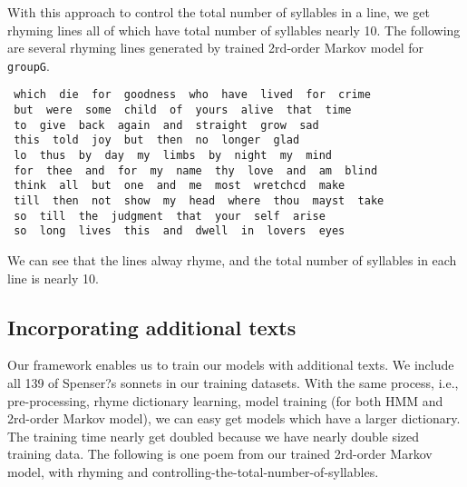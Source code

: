 With this approach to control the total number of syllables in a line, we get rhyming lines all of which have total number of syllables nearly 10. The following are several rhyming lines generated by trained 2rd-order Markov model for \texttt{groupG}.
\begin{lstlisting}
 which  die  for  goodness  who  have  lived  for  crime 
 but  were  some  child  of  yours  alive  that  time 
 to  give  back  again  and  straight  grow  sad 
 this  told  joy  but  then  no  longer  glad 
 lo  thus  by  day  my  limbs  by  night  my  mind 
 for  thee  and  for  my  name  thy  love  and  am  blind 
 think  all  but  one  and  me  most  wretchcd  make 
 till  then  not  show  my  head  where  thou  mayst  take 
 so  till  the  judgment  that  your  self  arise 
 so  long  lives  this  and  dwell  in  lovers  eyes 
\end{lstlisting}
We can see that the lines alway rhyme, and the total number of syllables in each line is nearly 10.


\subsection{Incorporating additional texts}
Our framework enables us to train our models with additional texts. We include all 139 of Spenser?s sonnets in our training datasets. With the same process, i.e., pre-processing, rhyme dictionary learning, model training (for both HMM and 2rd-order Markov model), we can easy get models which have a larger dictionary. The training time nearly get doubled because we have nearly double sized training data. The following is one poem from our trained 2rd-order Markov model, with rhyming and controlling-the-total-number-of-syllables.



